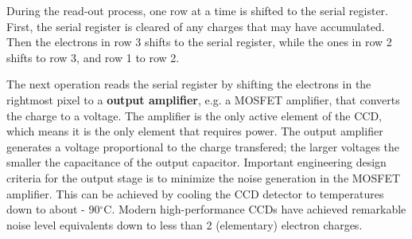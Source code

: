 During the read-out
process, one row at a time is shifted to the serial register. First, the serial
register is cleared of any charges that may have accumulated. Then the electrons in
row 3 shifts to the serial register, while the ones in row 2 shifts to row 3,
and row 1 to row 2.

The next operation reads the serial register by shifting the
electrons in the rightmost pixel to a \textbf{output amplifier}, e.g. a MOSFET
amplifier, that
converts the charge to a voltage. The amplifier is the only active element of
the CCD, which means it is the only element that requires power.
The output amplifier generates a voltage proportional to the charge
transfered; the larger voltages the smaller the capacitance of the
output capacitor. Important engineering design criteria for the output
stage is to minimize the noise generation in the MOSFET
amplifier. This can be achieved by cooling the CCD detector to
temperatures down to about - 90$^\circ$C.  Modern
high-performance CCDs have achieved remarkable noise level
equivalents down to less than 2 (elementary) electron charges.

